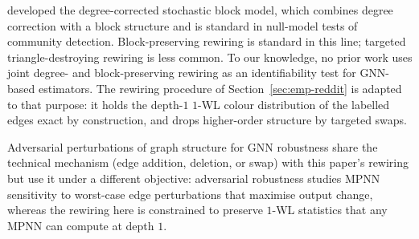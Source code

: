 \citet{Karrer2011StochasticBlock} developed the degree-corrected
stochastic block model, which combines degree correction with a
block structure and is standard in null-model tests of community
detection. Block-preserving rewiring is standard in this line;
targeted triangle-destroying rewiring is less common. To our
knowledge, no prior work uses joint degree- and block-preserving
rewiring as an identifiability test for GNN-based estimators. The
rewiring procedure of Section~\ref{sec:emp-reddit} is adapted to that
purpose: it holds the depth-$1$ $1$-WL colour distribution of the
labelled edges exact by construction, and drops higher-order
structure by targeted swaps.

Adversarial perturbations of graph structure for GNN robustness
\citep{Jin2020, Zugner2018} share the technical mechanism (edge
addition, deletion, or swap) with this paper's rewiring but use it
under a different objective: adversarial robustness studies MPNN
sensitivity to worst-case edge perturbations that maximise output
change, whereas the rewiring here is constrained to preserve
$1$-WL statistics that any MPNN can compute at depth $1$.
